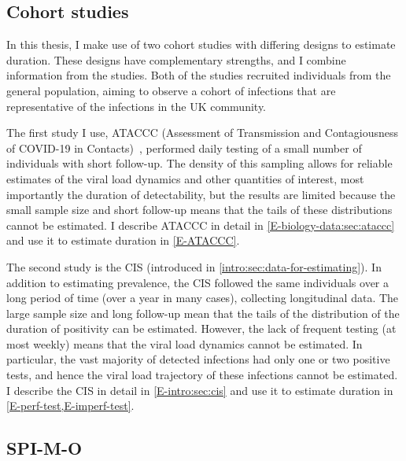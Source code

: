 \documentclass[thesis.tex]{subfiles}
\begin{document}
\subsection{Cohort studies}

In this thesis, I make use of two cohort studies with differing designs to estimate duration.
These designs have complementary strengths, and I combine information from the studies.
Both of the studies recruited individuals from the general population, aiming to observe a cohort of infections that are representative of the infections in the UK community.

The first study I use, ATACCC (Assessment of Transmission and Contagiousness of COVID-19 in Contacts)~\autocite{singanayagamCommunity,hakkiOnset}, performed daily testing of a small number of individuals with short follow-up.
The density of this sampling allows for reliable estimates of the viral load dynamics and other quantities of interest, most importantly the duration of detectability, but the results are limited because the small sample size and short follow-up means that the tails of these distributions cannot be estimated.
I describe ATACCC in detail in \cref{E-biology-data:sec:ataccc} and use it to estimate duration in \cref{E-ATACCC}.

The second study is the CIS (introduced in \cref{intro:sec:data-for-estimating}).
In addition to estimating prevalence, the CIS followed the same individuals over a long period of time (over a year in many cases), collecting longitudinal data.
The large sample size and long follow-up mean that the tails of the distribution of the duration of positivity can be estimated.
However, the lack of frequent testing (at most weekly) means that the viral load dynamics cannot be estimated.
In particular, the vast majority of detected infections had only one or two positive tests, and hence the viral load trajectory of these infections cannot be estimated.
I describe the CIS in detail in \cref{E-intro:sec:cis} and use it to estimate duration in \cref{E-perf-test,E-imperf-test}.

\subsection{SPI-M-O}
\end{document}
